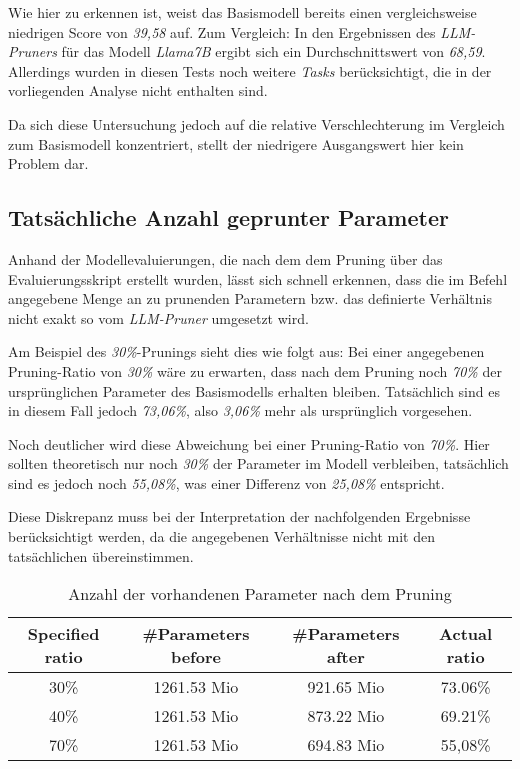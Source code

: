 Wie hier zu erkennen ist, weist das Basismodell bereits einen vergleichsweise
niedrigen Score von \emph{39,58} auf. Zum Vergleich: In den Ergebnissen des
\emph{LLM-Pruners} für das Modell \emph{Llama7B} ergibt sich ein
Durchschnittswert von \emph{68,59}. Allerdings wurden in diesen Tests noch
weitere \emph{Tasks} berücksichtigt, die in der vorliegenden Analyse nicht
enthalten sind.

Da sich diese Untersuchung jedoch auf die relative Verschlechterung im Vergleich
zum Basismodell konzentriert, stellt der niedrigere Ausgangswert hier kein
Problem dar.

\newpage

\subsection{Tatsächliche Anzahl geprunter Parameter}\label{param_count}

Anhand der Modellevaluierungen, die nach dem dem Pruning über das
Evaluierungsskript erstellt wurden, lässt sich schnell erkennen, dass die im
Befehl angegebene Menge an zu prunenden Parametern bzw. das definierte
Verhältnis nicht exakt so vom \emph{LLM-Pruner} umgesetzt wird.

Am Beispiel des \emph{30\%}-Prunings sieht dies wie folgt aus: Bei einer
angegebenen Pruning-Ratio von \emph{30\%} wäre zu erwarten, dass nach dem
Pruning noch \emph{70\%} der ursprünglichen Parameter des Basismodells erhalten
bleiben. Tatsächlich sind es in diesem Fall jedoch \emph{73,06\%}, also
\emph{3,06\%} mehr als ursprünglich vorgesehen.

Noch deutlicher wird diese Abweichung bei einer Pruning-Ratio von \emph{70\%}.
Hier sollten theoretisch nur noch \emph{30\%} der Parameter im Modell
verbleiben, tatsächlich sind es jedoch noch \emph{55,08\%}, was einer Differenz
von \emph{25,08\%} entspricht.

Diese Diskrepanz muss bei der Interpretation der nachfolgenden Ergebnisse
berücksichtigt werden, da die angegebenen Verhältnisse nicht mit den
tatsächlichen übereinstimmen.

\begin{table}[h]
	\centering
	\begin{tabular}{c | c c | c }
		\toprule
		\textbf{Specified ratio} & \textbf{\#Parameters before} & \textbf{\#Parameters after} & \textbf{Actual ratio} \\
		\midrule
		30\%                     & 1261.53 Mio                  & 921.65 Mio                  & 73.06\%               \\
		40\%                     & 1261.53 Mio                  & 873.22 Mio                  & 69.21\%               \\
		70\%                     & 1261.53 Mio                  & 694.83 Mio                  & 55,08\%               \\
		\midrule
	\end{tabular}
	\caption{Anzahl der vorhandenen Parameter nach dem Pruning}
	\label{tab:actualparameters}
\end{table}

